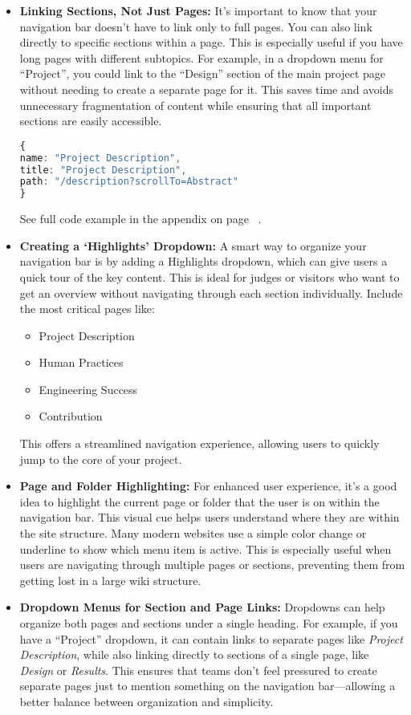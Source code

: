 \begin{itemize}
\item \textbf{Linking Sections, Not Just Pages:}
It’s important to know that your navigation bar doesn’t have to link only to full pages.
You can also link directly to specific sections within a page.
This is especially useful if you have long pages with different subtopics.
For example, in a dropdown menu for ``Project'', you could link to the ``Design'' section of the main project page without needing to create a separate page for it.
This saves time and avoids unnecessary fragmentation of content while ensuring that all important sections are easily accessible.
\begin{mybox}
    \begin{lstlisting}[language=TypeScript]
{
name: "Project Description",
title: "Project Description",
path: "/description?scrollTo=Abstract"
}
    \end{lstlisting}
\end{mybox}
See full code example in the appendix on page \ \pageref{lis:pagests}.
\item \textbf{Creating a ‘Highlights’ Dropdown:}
A smart way to organize your navigation bar is by adding a Highlights dropdown, which can give users a quick tour of the key content.
This is ideal for judges or visitors who want to get an overview without navigating through each section individually.
Include the most critical pages like:
\begin{itemize}
    \item Project Description
    \item Human Practices
    \item Engineering Success
    \item Contribution
\end{itemize}
This offers a streamlined navigation experience, allowing users to quickly jump to the core of your project.

\item \textbf{Page and Folder Highlighting:}
For enhanced user experience, it’s a good idea to highlight the current page or folder that the user is on within the navigation bar.
This visual cue helps users understand where they are within the site structure.
Many modern websites use a simple color change or underline to show which menu item is active.
This is especially useful when users are navigating through multiple pages or sections, preventing them from getting lost in a large wiki structure.

\item \textbf{Dropdown Menus for Section and Page Links:}
Dropdowns can help organize both pages and sections under a single heading.
For example, if you have a ``Project'' dropdown, it can contain links to separate pages like \textit{Project Description}, while also linking directly to sections of a single page, like \textit{Design} or \textit{Results}.
This ensures that teams don’t feel pressured to create separate pages just to mention something on the navigation bar—allowing a better balance between organization and simplicity.

\end{itemize}
